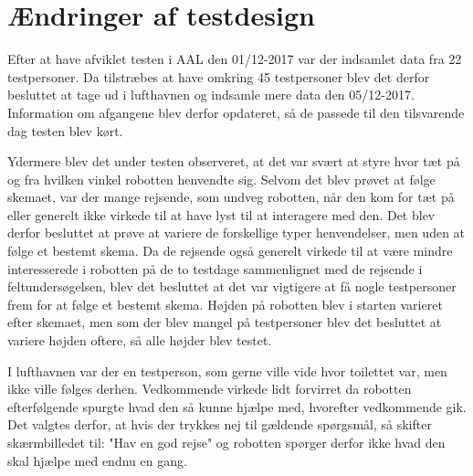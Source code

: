 \section{Ændringer af testdesign}
\label{TestAfSkalaerAendringerTD}
%
Efter at have afviklet testen i AAL den 01/12-2017 var der indsamlet data fra 22 testpersoner. Da tilstræbes at have omkring 45 testpersoner blev det derfor besluttet at tage ud i lufthavnen og indsamle mere data den 05/12-2017. Information om afgangene blev derfor opdateret, så de passede til den tilsvarende dag testen blev kørt. 

Ydermere blev det under testen observeret, at det var svært at styre hvor tæt på og fra hvilken vinkel robotten henvendte sig. Selvom det blev prøvet at følge skemaet, var der mange rejsende, som undveg robotten, når den kom for tæt på eller generelt ikke virkede til at have lyst til at interagere med den. Det blev derfor besluttet at prøve at variere de forskellige typer henvendelser, men uden at følge et bestemt skema. Da de rejsende også generelt virkede til at være mindre interesserede i robotten på de to testdage sammenlignet med de rejsende i feltundersøgelsen, blev det besluttet at det var vigtigere at få nogle testpersoner frem for at følge et bestemt skema. Højden på robotten blev i starten varieret efter skemaet, men som der blev mangel på testpersoner blev det besluttet at variere højden oftere, så alle højder blev testet.

I lufthavnen var der en testperson, som gerne ville vide hvor toilettet var, men ikke ville følges derhen. Vedkommende virkede lidt forvirret da robotten efterfølgende spurgte hvad den så kunne hjælpe med, hvorefter vedkommende gik. Det valgtes derfor, at hvis der trykkes nej til gældende spørgsmål, så skifter skærmbilledet til: "Hav en god rejse" og robotten spørger derfor ikke hvad den skal hjælpe med endnu en gang.